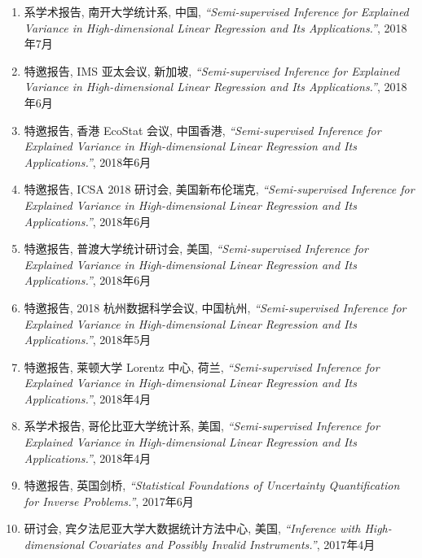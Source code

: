 \documentclass[margin, line]{res}
\begin{document}
\begin{resume}
\begin{enumerate}
            \item 系学术报告, 南开大学统计系, 中国, {\it ``Semi-supervised Inference for Explained Variance in High-dimensional Linear Regression and Its Applications.''}, 
                2018年7月

            \item 特邀报告, IMS 亚太会议, 新加坡, 
                {\it ``Semi-supervised Inference for Explained Variance in High-dimensional Linear Regression and Its Applications.''}, 
                2018年6月

            \item 特邀报告, 香港 EcoStat 会议, 中国香港, {\it ``Semi-supervised Inference for Explained Variance in High-dimensional Linear Regression and Its Applications.''}, 
                2018年6月

            \item 特邀报告, ICSA 2018 研讨会, 美国新布伦瑞克, {\it ``Semi-supervised Inference for Explained Variance in High-dimensional Linear Regression and Its Applications.''}, 
                2018年6月

            \item 特邀报告, 普渡大学统计研讨会, 美国, 
                {\it ``Semi-supervised Inference for Explained Variance in High-dimensional Linear Regression and Its Applications.''}, 
                2018年6月

            \item 特邀报告, 2018 杭州数据科学会议, 中国杭州, 
                {\it ``Semi-supervised Inference for Explained Variance in High-dimensional Linear Regression and Its Applications.''}, 
                2018年5月

            \item 特邀报告, 莱顿大学 Lorentz 中心, 荷兰, {\it ``Semi-supervised Inference for Explained Variance in High-dimensional Linear Regression and Its Applications.''}, 
                2018年4月

            \item 系学术报告, 哥伦比亚大学统计系, 美国, {\it ``Semi-supervised Inference for Explained Variance in High-dimensional Linear Regression and Its Applications.''}, 
                2018年4月

			\item 特邀报告, 英国剑桥, {\it ``Statistical Foundations of Uncertainty Quantification for Inverse Problems.''}, 
                2017年6月

            \item 研讨会, 宾夕法尼亚大学大数据统计方法中心, 美国, {\it ``Inference with High-dimensional Covariates and Possibly Invalid Instruments.''}, 
                2017年4月


\end{enumerate}
\end{resume}
\end{document}
